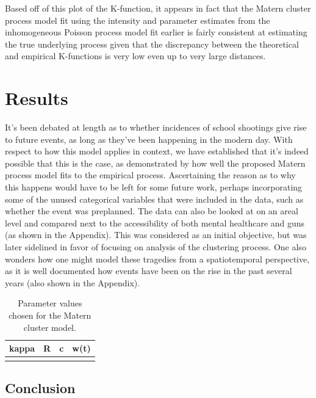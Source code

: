 \documentclass[
  12pt,
]{article}
\begin{document}
Based off of this plot of the K-function, it appears in fact that the
Matern cluster process model fit using the intensity and parameter
estimates from the inhomogeneous Poisson process model fit earlier is
fairly consistent at estimating the true underlying process given that
the discrepancy between the theoretical and empirical K-functions is
very low even up to very large distances.

\hypertarget{results}{%
\section{Results}\label{results}}

It's been debated at length as to whether incidences of school shootings
give rise to future events, as long as they've been happening in the
modern day. With respect to how this model applies in context, we have
established that it's indeed possible that this is the case, as
demonstrated by how well the proposed Matern process model fits to the
empirical process. Ascertaining the reason as to why this happens would
have to be left for some future work, perhaps incorporating some of the
unused categorical variables that were included in the data, such as
whether the event was preplanned. The data can also be looked at on an
areal level and compared next to the accessibility of both mental
healthcare and guns (as shown in the Appendix). This was considered as
an initial objective, but was later sidelined in favor of focusing on
analysis of the clustering process. One also wonders how one might model
these tragedies from a spatiotemporal perspective, as it is well
documented how events have been on the rise in the past several years
(also shown in the Appendix).

\begin{table}

\caption{\label{tab:tbl-matern-process}Parameter values chosen for the Matern cluster model.}
\centering
\begin{tabular}[t]{rrrr}
\toprule
kappa & R & c & w(t)\\
\midrule
\cellcolor{gray!6}{0.0172795} & \cellcolor{gray!6}{1.322571} & \cellcolor{gray!6}{0.25} & \cellcolor{gray!6}{1}\\
\bottomrule
\end{tabular}
\end{table}

\hypertarget{conclusion}{%
\subsection{Conclusion}\label{conclusion}}
\end{document}
